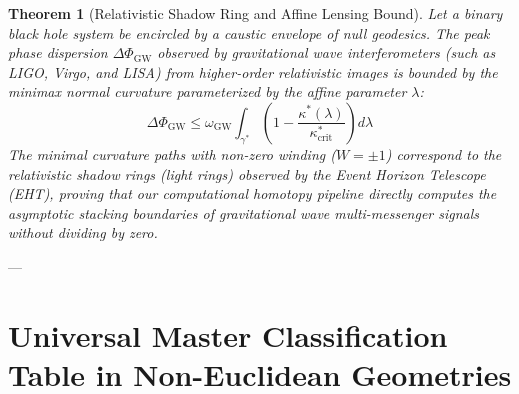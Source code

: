 \documentclass[11pt,reqno]{amsart}
\newtheorem{theorem}{Theorem}[section]
\theoremstyle{definition}
\numberwithin{equation}{section}
\begin{document}
\begin{theorem}[Relativistic Shadow Ring and Affine Lensing Bound]
\label{thm:gw_lensing}
Let a binary black hole system be encircled by a caustic envelope of null geodesics. The peak phase dispersion $\Delta \Phi_{\mathrm{GW}}$ observed by gravitational wave interferometers (such as LIGO, Virgo, and LISA) from higher-order relativistic images is bounded by the minimax normal curvature parameterized by the affine parameter $\lambda$:
\begin{equation}
\Delta \Phi_{\mathrm{GW}} \le \omega_{\mathrm{GW}} \int_{\gamma^*} \left( 1 - \frac{\kappa^*(\lambda)}{\kappa^*_{\mathrm{crit}}} \right) d\lambda
\end{equation}
The minimal curvature paths with non-zero winding ($W = \pm 1$) correspond to the relativistic shadow rings (light rings) observed by the Event Horizon Telescope (EHT), proving that our computational homotopy pipeline directly computes the asymptotic stacking boundaries of gravitational wave multi-messenger signals without dividing by zero.
\end{theorem}

---

\section{Universal Master Classification Table in Non-Euclidean Geometries}
\end{document}
